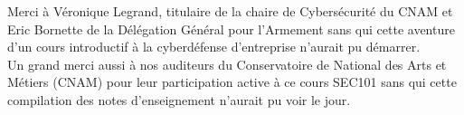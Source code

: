 

\newpage

\thispagestyle{empty}

\begin{center}

\Large{Merci à Véronique Legrand, titulaire de la chaire de Cybersécurité du CNAM et Eric Bornette de la Délégation Général pour l'Armement sans qui cette aventure d'un cours introductif à la cyberdéfense d'entreprise n'aurait pu démarrer. 
\\ 


Un grand merci aussi à nos auditeurs du Conservatoire de National des Arts et Métiers (CNAM) pour leur participation active à ce cours SEC101 sans qui cette compilation des notes d'enseignement n'aurait pu voir le jour. 
}

\end{center}

\clearpage 


